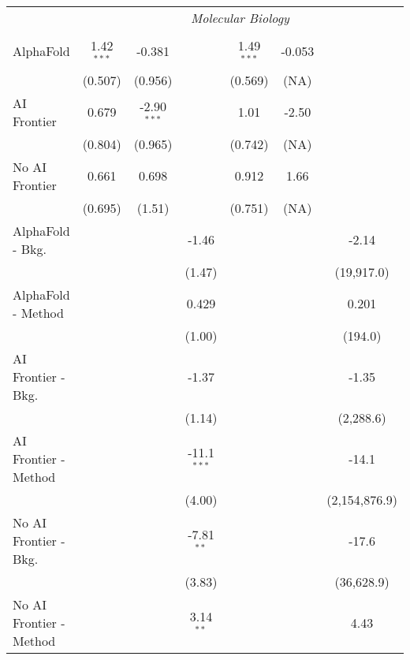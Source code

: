 \begin{tabular}{lcccccc}
 & \multicolumn{6}{c}{\textit{Molecular Biology}} \\ \\
   AlphaFold               & 1.42$^{***}$ & -0.381        &               & 1.49$^{***}$ & -0.053 &   \\   
                           & (0.507)      & (0.956)       &               & (0.569)      & (NA)   &   \\   
   AI Frontier             & 0.679        & -2.90$^{***}$ &               & 1.01         & -2.50  &   \\   
                           & (0.804)      & (0.965)       &               & (0.742)      & (NA)   &   \\   
   No AI Frontier          & 0.661        & 0.698         &               & 0.912        & 1.66   &   \\   
                           & (0.695)      & (1.51)        &               & (0.751)      & (NA)   &   \\   
   AlphaFold - Bkg.        &              &               & -1.46         &              &        & -2.14\\   
                           &              &               & (1.47)        &              &        & (19,917.0)\\   
   AlphaFold - Method      &              &               & 0.429         &              &        & 0.201\\   
                           &              &               & (1.00)        &              &        & (194.0)\\   
   AI Frontier - Bkg.      &              &               & -1.37         &              &        & -1.35\\   
                           &              &               & (1.14)        &              &        & (2,288.6)\\   
   AI Frontier - Method    &              &               & -11.1$^{***}$ &              &        & -14.1\\   
                           &              &               & (4.00)        &              &        & (2,154,876.9)\\   
   No AI Frontier - Bkg.   &              &               & -7.81$^{**}$  &              &        & -17.6\\   
                           &              &               & (3.83)        &              &        & (36,628.9)\\   
   No AI Frontier - Method &              &               & 3.14$^{**}$   &              &        & 4.43\\   

\end{tabular}
